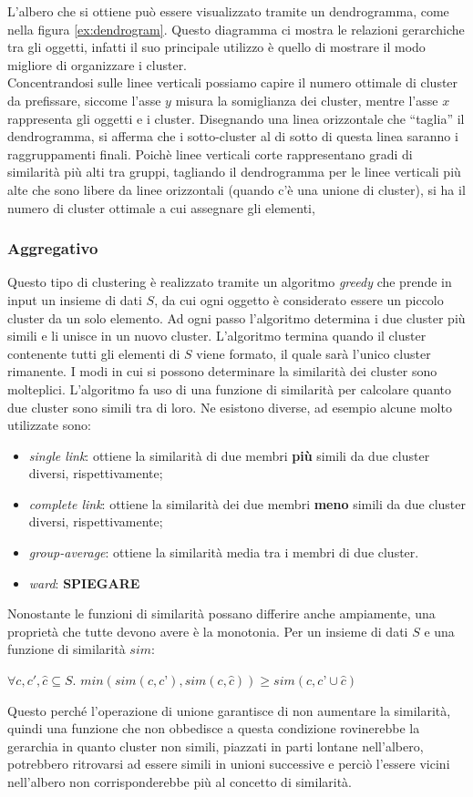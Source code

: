 \documentclass{llncs}
\newcommand{\acapo}{\vspace{0.5\baselineskip}\\}
\begin{document}
	\clearpage
	L'albero che si ottiene può essere visualizzato tramite un dendrogramma, come nella figura \ref{ex:dendrogram}.
	Questo diagramma ci mostra le relazioni gerarchiche tra gli oggetti, infatti il suo principale utilizzo è quello di 
	mostrare il modo migliore di organizzare i cluster. 
	\acapo
	Concentrandosi sulle linee verticali possiamo capire il numero ottimale di cluster
	da prefissare, siccome l'asse $y$ misura la somiglianza dei cluster, mentre l'asse $x$ rappresenta gli oggetti e i cluster.
	Disegnando una linea orizzontale che ``taglia'' il dendrogramma, si afferma che i sotto-cluster al di sotto di questa linea saranno i raggruppamenti finali.
	Poichè linee verticali corte rappresentano gradi di similarità più alti tra gruppi, tagliando il dendrogramma per le linee verticali più alte che sono libere da 
	linee orizzontali (quando c'è una unione di cluster), si ha il numero di cluster ottimale a cui assegnare gli elementi,

	\subsubsection{Aggregativo}
	Questo tipo di clustering è realizzato tramite un algoritmo \textit{greedy} che prende in input un insieme di dati $S$, da cui ogni oggetto è considerato essere un piccolo cluster da un solo elemento.
	Ad ogni passo l'algoritmo determina i due cluster più simili e li unisce in un nuovo cluster. L'algoritmo termina
	quando il cluster contenente tutti gli elementi di $S$ viene formato, il quale sarà l'unico cluster rimanente.
	I modi in cui si possono determinare la similarità dei cluster sono molteplici. L'algoritmo fa uso di una funzione di similarità per calcolare quanto due cluster sono simili tra di loro.
	Ne esistono diverse, ad esempio alcune molto utilizzate sono:
	\begin{itemize}
		\item \textit{single link}: ottiene la similarità di due membri \textbf{più} simili da due cluster diversi, rispettivamente;
		\item \textit{complete link}: ottiene la similarità dei due membri \textbf{meno} simili da due cluster diversi, rispettivamente;
		\item \textit{group-average}: ottiene la similarità media tra i membri di due cluster.
		\item \textit{ward}: \textbf{SPIEGARE}
	\end{itemize}
	Nonostante le funzioni di similarità possano differire anche ampiamente, una proprietà che tutte devono avere è la monotonia. Per un insieme di dati $S$ e una funzione di similarità $sim$:
	\begin{center}
		$\forall c, c', \hat{c} \subseteq S$. $min(sim(c, c’), sim(c, \hat{c})) \ge sim(c, c’ \cup \hat{c})$
	\end{center}
	Questo perché l'operazione di unione garantisce	di non aumentare la similarità, quindi una funzione che non obbedisce a questa condizione
	rovinerebbe la gerarchia in quanto cluster non simili, piazzati in parti lontane nell'albero, potrebbero
	ritrovarsi ad essere simili in unioni successive e perciò l'essere vicini nell'albero non corrisponderebbe più al concetto di similarità.
\end{document}
